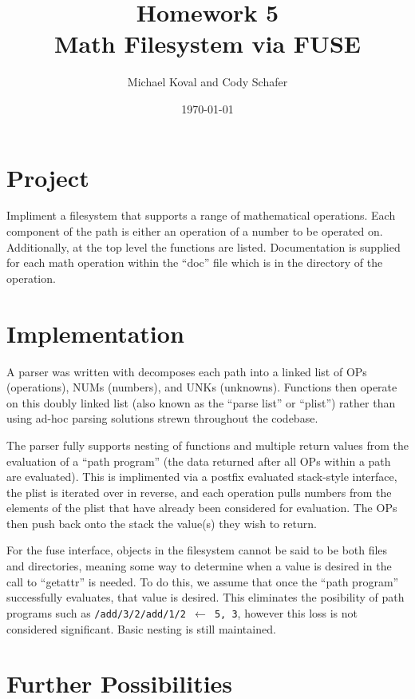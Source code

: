 \documentclass[10pt]{article}
\title{\textbf{Homework 5}\\
Math Filesystem via FUSE}
\author{Michael Koval and Cody Schafer}
\date{\today}
\begin{document}
\maketitle

\section{Project}

Impliment a filesystem that supports a range of mathematical operations.
Each component of the path is either an operation of a number to be
operated on. Additionally, at the top level the functions are listed.
Documentation is supplied for each math operation within the ``doc'' file
which is in the directory of the operation.

\section{Implementation}

A parser was written with decomposes each path into a linked list of OPs
(operations), NUMs (numbers), and UNKs (unknowns). Functions then operate
on this doubly linked list (also known as the ``parse list'' or ``plist'')
rather than using ad-hoc parsing solutions strewn throughout the codebase.

The parser fully supports nesting of functions and multiple return values
from the evaluation of a ``path program'' (the data returned after all
OPs within a path are evaluated). This is implimented via a postfix
evaluated stack-style interface, the plist is iterated over in reverse,
and each operation pulls numbers from the elements of the plist that have
already been considered for evaluation. The OPs then push back onto the
stack the value(s) they wish to return.

For the fuse interface, objects in the filesystem cannot be said to be
both files and directories, meaning some way to determine when a value is
desired in the call to ``getattr'' is needed. To do this, we assume that
once the ``path program'' successfully evaluates, that value is desired.
This eliminates the posibility of path programs such as
\texttt{/add/3/2/add/1/2 $\leftarrow$ 5, 3}, however this loss is not
considered significant. Basic nesting is still maintained.

\section{Further Possibilities}
\end{document}
